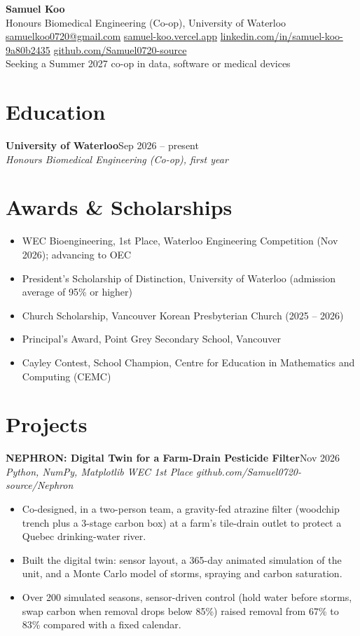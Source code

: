 \documentclass[10pt,letterpaper]{article}
\newcommand{\entry}[3]{\needspace{4\baselineskip}\textbf{#1}\hfill #2\\{\small\itshape #3}\par}
\begin{document}
{\LARGE\bfseries Samuel Koo}\\[3pt]
Honours Biomedical Engineering (Co-op), University of Waterloo\\[2pt]
{\small \href{mailto:samuelkoo0720@gmail.com}{samuelkoo0720@gmail.com} \textbar{}
\href{https://samuel-koo.vercel.app}{samuel-koo.vercel.app} \textbar{}
\href{https://www.linkedin.com/in/samuel-koo-9a80b2435/}{linkedin.com/in/samuel-koo-9a80b2435} \textbar{}
\href{https://github.com/Samuel0720-source}{github.com/Samuel0720-source}}\\[2pt]
Seeking a Summer 2027 co-op in data, software or medical devices

\section{Education}
\entry{University of Waterloo}{Sep 2026 -- present}{Honours Biomedical Engineering (Co-op), first year}

\section{Awards \& Scholarships}
\begin{itemize}
  \item WEC Bioengineering, 1st Place, Waterloo Engineering Competition (Nov 2026); advancing to OEC
  \item President's Scholarship of Distinction, University of Waterloo (admission average of 95\% or higher)
  \item Church Scholarship, Vancouver Korean Presbyterian Church (2025 -- 2026)
  \item Principal's Award, Point Grey Secondary School, Vancouver
  \item Cayley Contest, School Champion, Centre for Education in Mathematics and Computing (CEMC)
\end{itemize}

\section{Projects}
\entry{NEPHRON: Digital Twin for a Farm-Drain Pesticide Filter}{Nov 2026}{Python, NumPy, Matplotlib \textbar{} WEC 1st Place \textbar{} github.com/Samuel0720-source/Nephron}
\begin{itemize}
  \item Co-designed, in a two-person team, a gravity-fed atrazine filter (woodchip trench plus a 3-stage carbon box) at a farm's tile-drain outlet to protect a Quebec drinking-water river.
  \item Built the digital twin: sensor layout, a 365-day animated simulation of the unit, and a Monte Carlo model of storms, spraying and carbon saturation.
  \item Over 200 simulated seasons, sensor-driven control (hold water before storms, swap carbon when removal drops below 85\%) raised removal from 67\% to 83\% compared with a fixed calendar.
\end{itemize}
\end{document}
